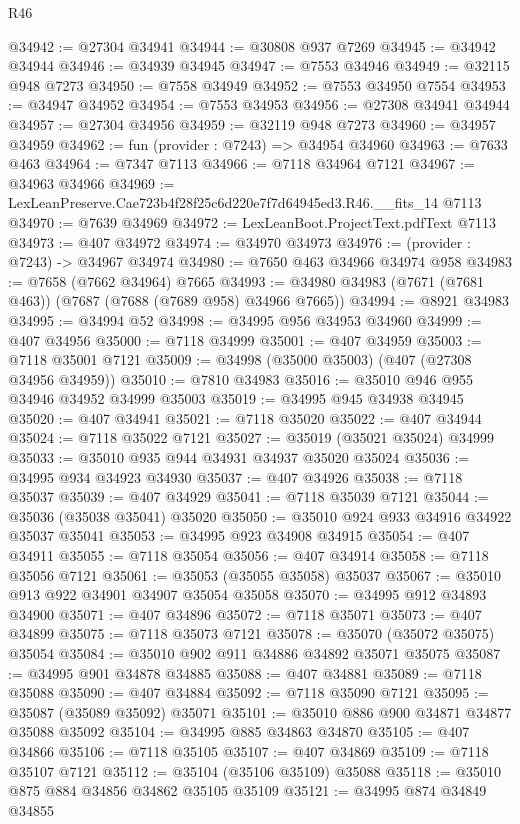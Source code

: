 \begin{lexlean}{R46}
\begin{coremodule}
@34942 := @27304 @34941
@34944 := @30808 @937 @7269
@34945 := @34942 @34944
@34946 := @34939 @34945
@34947 := @7553 @34946
@34949 := @32115 @948 @7273
@34950 := @7558 @34949
@34952 := @7553 @34950 @7554
@34953 := @34947 @34952
@34954 := @7553 @34953
@34956 := @27308 @34941 @34944
@34957 := @27304 @34956
@34959 := @32119 @948 @7273
@34960 := @34957 @34959
@34962 := fun (provider : @7243) => @34954 @34960
@34963 := @7633 @463
@34964 := @7347 @7113
@34966 := @7118 @34964 @7121
@34967 := @34963 @34966
@34969 := LexLeanPreserve.Cae723b4f28f25c6d220e7f7d64945ed3.R46.__fits_14 @7113
@34970 := @7639 @34969
@34972 := LexLeanBoot.ProjectText.pdfText @7113
@34973 := @407 @34972
@34974 := @34970 @34973
@34976 := (provider : @7243) -> @34967 @34974
@34980 := @7650 @463 @34966 @34974 @958
@34983 := @7658 (@7662 @34964) @7665
@34993 := @34980 @34983 (@7671 (@7681 @463)) (@7687 (@7688 (@7689 @958) @34966 @7665))
@34994 := @8921 @34983
@34995 := @34994 @52
@34998 := @34995 @956 @34953 @34960
@34999 := @407 @34956
@35000 := @7118 @34999
@35001 := @407 @34959
@35003 := @7118 @35001 @7121
@35009 := @34998 (@35000 @35003) (@407 (@27308 @34956 @34959))
@35010 := @7810 @34983
@35016 := @35010 @946 @955 @34946 @34952 @34999 @35003
@35019 := @34995 @945 @34938 @34945
@35020 := @407 @34941
@35021 := @7118 @35020
@35022 := @407 @34944
@35024 := @7118 @35022 @7121
@35027 := @35019 (@35021 @35024) @34999
@35033 := @35010 @935 @944 @34931 @34937 @35020 @35024
@35036 := @34995 @934 @34923 @34930
@35037 := @407 @34926
@35038 := @7118 @35037
@35039 := @407 @34929
@35041 := @7118 @35039 @7121
@35044 := @35036 (@35038 @35041) @35020
@35050 := @35010 @924 @933 @34916 @34922 @35037 @35041
@35053 := @34995 @923 @34908 @34915
@35054 := @407 @34911
@35055 := @7118 @35054
@35056 := @407 @34914
@35058 := @7118 @35056 @7121
@35061 := @35053 (@35055 @35058) @35037
@35067 := @35010 @913 @922 @34901 @34907 @35054 @35058
@35070 := @34995 @912 @34893 @34900
@35071 := @407 @34896
@35072 := @7118 @35071
@35073 := @407 @34899
@35075 := @7118 @35073 @7121
@35078 := @35070 (@35072 @35075) @35054
@35084 := @35010 @902 @911 @34886 @34892 @35071 @35075
@35087 := @34995 @901 @34878 @34885
@35088 := @407 @34881
@35089 := @7118 @35088
@35090 := @407 @34884
@35092 := @7118 @35090 @7121
@35095 := @35087 (@35089 @35092) @35071
@35101 := @35010 @886 @900 @34871 @34877 @35088 @35092
@35104 := @34995 @885 @34863 @34870
@35105 := @407 @34866
@35106 := @7118 @35105
@35107 := @407 @34869
@35109 := @7118 @35107 @7121
@35112 := @35104 (@35106 @35109) @35088
@35118 := @35010 @875 @884 @34856 @34862 @35105 @35109
@35121 := @34995 @874 @34849 @34855

\end{coremodule}
\end{lexlean}
